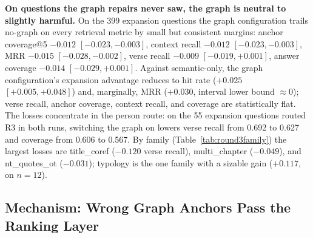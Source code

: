 \textbf{On questions the graph repairs never saw, the graph is
neutral to slightly harmful.} On the 399 expansion questions the graph
configuration trails no-graph on every retrieval metric by small but
consistent margins: anchor coverage@5 $-0.012$ $[-0.023, -0.003]$, context
recall $-0.012$ $[-0.023, -0.003]$, MRR $-0.015$ $[-0.028, -0.002]$,
verse recall $-0.009$ $[-0.019, +0.001]$, answer coverage $-0.014$
$[-0.029, +0.001]$. Against semantic-only, the graph configuration's
expansion advantage reduces to hit rate ($+0.025$ $[+0.005, +0.048]$)
and, marginally, MRR ($+0.030$, interval lower bound $\approx 0$); verse
recall, anchor coverage, context recall, and coverage are statistically
flat. The losses
concentrate in the person route: on the 55 expansion questions routed
R3 in both runs, switching the graph on lowers verse recall from 0.692
to 0.627 and coverage from 0.606 to 0.567. By family
(Table~\ref{tab:round3family}) the largest losses are title\_coref
($-0.120$ verse recall), multi\_chapter ($-0.049$), and nt\_quotes\_ot
($-0.031$); typology is the one family with a sizable gain ($+0.117$,
on $n=12$).

\subsection{Mechanism: Wrong Graph Anchors Pass the Ranking Layer}
\label{sec:round3mech}

